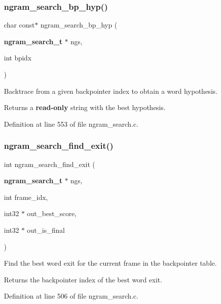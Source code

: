 \subsubsection{ngram\+\_\+search\+\_\+bp\+\_\+hyp()}
{\footnotesize\ttfamily char const$\ast$ ngram\+\_\+search\+\_\+bp\+\_\+hyp (\begin{DoxyParamCaption}\item[{\textbf{ ngram\+\_\+search\+\_\+t} $\ast$}]{ngs,  }\item[{int}]{bpidx }\end{DoxyParamCaption})}



Backtrace from a given backpointer index to obtain a word hypothesis. 

\begin{DoxyReturn}{Returns}
a {\bfseries read-\/only} string with the best hypothesis. 
\end{DoxyReturn}


Definition at line 553 of file ngram\+\_\+search.\+c.

\mbox{\label{ngram__search_8h_ac6a01bb08e7b8d1deb39763a98148cb0}} 
\subsubsection{ngram\+\_\+search\+\_\+find\+\_\+exit()}
{\footnotesize\ttfamily int ngram\+\_\+search\+\_\+find\+\_\+exit (\begin{DoxyParamCaption}\item[{\textbf{ ngram\+\_\+search\+\_\+t} $\ast$}]{ngs,  }\item[{int}]{frame\+\_\+idx,  }\item[{int32 $\ast$}]{out\+\_\+best\+\_\+score,  }\item[{int32 $\ast$}]{out\+\_\+is\+\_\+final }\end{DoxyParamCaption})}



Find the best word exit for the current frame in the backpointer table. 

\begin{DoxyReturn}{Returns}
the backpointer index of the best word exit. 
\end{DoxyReturn}


Definition at line 506 of file ngram\+\_\+search.\+c.



